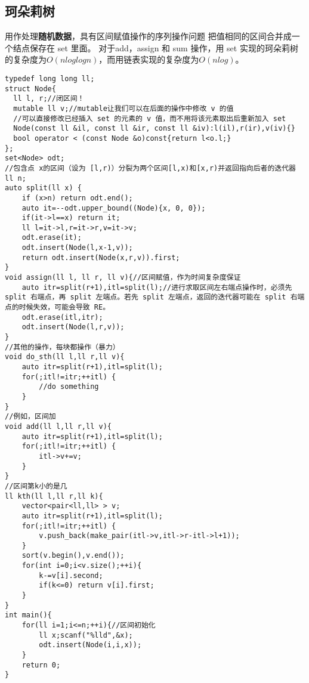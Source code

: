 \documentclass[UTF8]{ctexart}
\begin{document}
\subsection{珂朵莉树}
用作处理\textbf{随机数据}，具有区间赋值操作的序列操作问题
把值相同的区间合并成一个结点保存在 set 里面。
对于add，assign 和 sum 操作，用 set 实现的珂朵莉树的复杂度为$O(nloglogn)$，而用链表实现的复杂度为$O(nlog)$。
\begin{lstlisting}
typedef long long ll;
struct Node{
  ll l, r;//闭区间！
  mutable ll v;//mutable让我们可以在后面的操作中修改 v 的值
  //可以直接修改已经插入 set 的元素的 v 值，而不用将该元素取出后重新加入 set
  Node(const ll &il, const ll &ir, const ll &iv):l(il),r(ir),v(iv){}
  bool operator < (const Node &o)const{return l<o.l;}
};
set<Node> odt;
//包含点 x的区间（设为 [l,r)）分裂为两个区间[l,x)和[x,r)并返回指向后者的迭代器
ll n;
auto split(ll x) {
	if (x>n) return odt.end();
	auto it=--odt.upper_bound((Node){x, 0, 0});
	if(it->l==x) return it;
	ll l=it->l,r=it->r,v=it->v;
	odt.erase(it);
	odt.insert(Node(l,x-1,v));
	return odt.insert(Node(x,r,v)).first;
} 
void assign(ll l, ll r, ll v){//区间赋值，作为时间复杂度保证
	auto itr=split(r+1),itl=split(l);//进行求取区间左右端点操作时，必须先 split 右端点，再 split 左端点。若先 split 左端点，返回的迭代器可能在 split 右端点的时候失效，可能会导致 RE。
	odt.erase(itl,itr);
	odt.insert(Node(l,r,v));
}
//其他的操作，每块都操作（暴力）
void do_sth(ll l,ll r,ll v){
	auto itr=split(r+1),itl=split(l);
	for(;itl!=itr;++itl) {
		//do something
	}
}
//例如，区间加
void add(ll l,ll r,ll v){
	auto itr=split(r+1),itl=split(l);
	for(;itl!=itr;++itl) {
		itl->v+=v;	
	}
}
//区间第k小的是几
ll kth(ll l,ll r,ll k){
	vector<pair<ll,ll> > v;
	auto itr=split(r+1),itl=split(l);
	for(;itl!=itr;++itl) {
		v.push_back(make_pair(itl->v,itl->r-itl->l+1));
	}
	sort(v.begin(),v.end());
	for(int i=0;i<v.size();++i){
		k-=v[i].second;
		if(k<=0) return v[i].first;
	}
}
int main(){
	for(ll i=1;i<=n;++i){//区间初始化
        ll x;scanf("%lld",&x);
		odt.insert(Node(i,i,x));
	}
	return 0;
}
\end{lstlisting}
\end{document}
